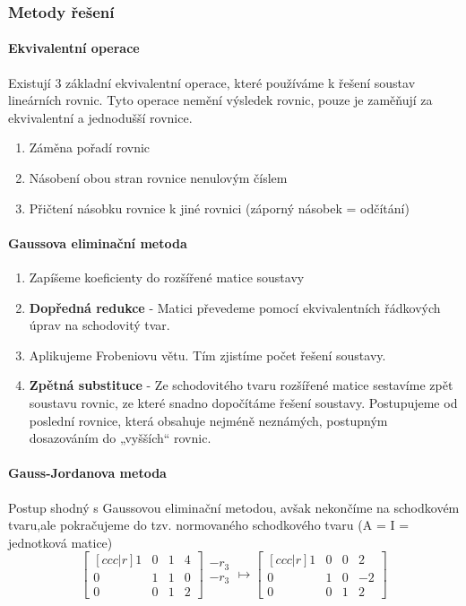 \documentclass[10pt,a4paper]{article}
\begin{document}
\subsubsection{Metody řešení}
\paragraph{Ekvivalentní operace}
Existují 3 základní ekvivalentní operace, které používáme k řešení soustav lineárních rovnic. Tyto operace nemění výsledek rovnic, pouze je zaměňují za ekvivalentní a jednodušší rovnice.
\begin{enumerate}
\item Záměna pořadí rovnic
\item Násobení obou stran rovnice nenulovým číslem
\item Přičtení násobku rovnice k jiné rovnici (záporný násobek = odčítání)
\end{enumerate}
\paragraph{Gaussova eliminační metoda}
\begin{enumerate}
\item Zapíšeme koeficienty do rozšířené matice soustavy
\item \textbf{Dopředná redukce} - Matici převedeme pomocí ekvivalentních řádkových úprav na schodovitý tvar.
\item Aplikujeme Frobeniovu větu. Tím zjistíme počet řešení soustavy.
\item \textbf{Zpětná substituce} - Ze schodovitého tvaru rozšířené matice sestavíme zpět soustavu rovnic, ze které snadno dopočítáme řešení soustavy. Postupujeme od poslední rovnice, která obsahuje nejméně neznámých, postupným dosazováním do „vyšších“ rovnic.
\end{enumerate}
\paragraph{Gauss-Jordanova metoda}
Postup shodný s Gaussovou eliminační metodou, avšak nekončíme na schodkovém tvaru,ale pokračujeme do tzv. normovaného schodkového tvaru (A = I = jednotková matice)
\begin{equation}
\begin{bmatrix}[ccc|r]
1 & 0 & 1 & 4\\ 
0 & 1 & 1 & 0\\ 
0 & 0 & 1 & 2
\end{bmatrix} 
\begin{matrix}
-r_3\\ 
-r_3\\ 
~
\end{matrix} 
\mapsto
\begin{bmatrix}[ccc|r]
1 & 0 & 0 & 2\\ 
0 & 1 & 0 & -2\\ 
0 & 0 & 1 & 2
\end{bmatrix}   
\end{equation}
\end{document}
